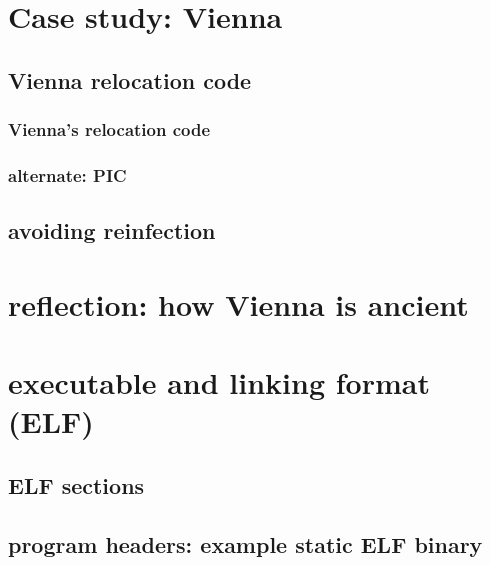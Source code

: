 \section{Case study: Vienna}



\subsection{Vienna relocation code}

\subsubsection{Vienna's relocation code}


\subsubsection{alternate: PIC}


\subsection{avoiding reinfection}



\section{reflection: how Vienna is ancient}



\section{executable and linking format (ELF)}



\subsection{ELF sections}


\subsection{program headers: example static ELF binary}


